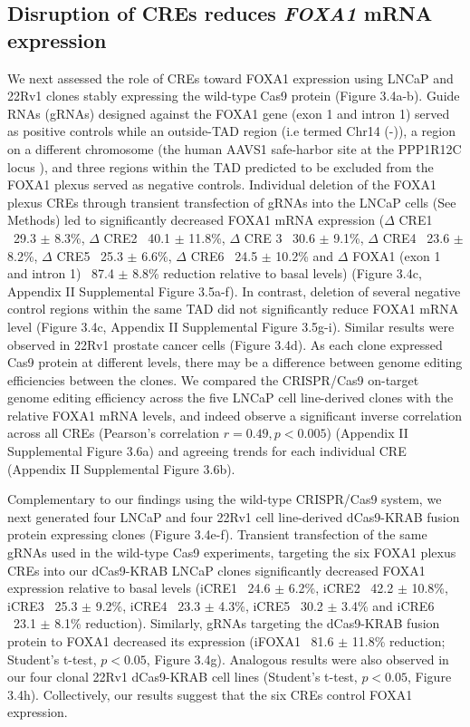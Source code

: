 \subsection{Disruption of CREs reduces \emph{FOXA1} mRNA expression}

We next assessed the role of CREs toward FOXA1 expression using LNCaP and 22Rv1 clones stably expressing the wild-type Cas9 protein (Figure 3.4a-b).
Guide RNAs (gRNAs) designed against the FOXA1 gene (exon 1 and intron 1) served as positive controls while an outside-TAD region (i.e termed Chr14 (-)), a region on a different chromosome (the human AAVS1 safe-harbor site at the PPP1R12C locus \cite{kronTMPRSS2ERGFusion2017,dekelverFunctionalGenomicsProteomics2010}), and three regions within the TAD predicted to be excluded from the FOXA1 plexus served as negative controls.
Individual deletion of the FOXA1 plexus CREs through transient transfection of gRNAs into the LNCaP cells (See Methods) led to significantly decreased FOXA1 mRNA expression ($\Delta$ CRE1 ~29.3 $\pm$ 8.3\%, $\Delta$ CRE2 ~40.1 $\pm$ 11.8\%, $\Delta$ CRE 3 ~30.6 $\pm$ 9.1\%, $\Delta$ CRE4 ~23.6 $\pm$ 8.2\%, $\Delta$ CRE5 ~25.3 $\pm$ 6.6\%, $\Delta$ CRE6 ~24.5 $\pm$ 10.2\% and $\Delta$ FOXA1 (exon 1 and intron 1) ~87.4 $\pm$ 8.8\% reduction relative to basal levels) (Figure 3.4c, Appendix II Supplemental Figure 3.5a-f).
In contrast, deletion of several negative control regions within the same TAD did not significantly reduce FOXA1 mRNA level (Figure 3.4c, Appendix II Supplemental Figure 3.5g-i).
Similar results were observed in 22Rv1 prostate cancer cells (Figure 3.4d).
As each clone expressed Cas9 protein at different levels, there may be a difference between genome editing efficiencies between the clones.
We compared the CRISPR/Cas9 on-target genome editing efficiency across the five LNCaP cell line-derived clones with the relative FOXA1 mRNA levels, and indeed observe a significant inverse correlation across all CREs (Pearson’s correlation $r = 0.49, p < 0.005$) (Appendix II Supplemental Figure 3.6a) and agreeing trends for each individual CRE (Appendix II Supplemental Figure 3.6b).

Complementary to our findings using the wild-type CRISPR/Cas9 system, we next generated four LNCaP and four 22Rv1 cell line-derived dCas9-KRAB fusion protein expressing clones (Figure 3.4e-f).
Transient transfection of the same gRNAs used in the wild-type Cas9 experiments, targeting the six FOXA1 plexus CREs into our dCas9-KRAB LNCaP clones significantly decreased FOXA1 expression relative to basal levels (iCRE1 ~24.6 $\pm$ 6.2\%, iCRE2 ~42.2 $\pm$ 10.8\%, iCRE3 ~25.3 $\pm$ 9.2\%, iCRE4 ~23.3 $\pm$ 4.3\%, iCRE5 ~30.2 $\pm$ 3.4\% and iCRE6 ~23.1 $\pm$ 8.1\% reduction).
Similarly, gRNAs targeting the dCas9-KRAB fusion protein to FOXA1 decreased its expression (iFOXA1 ~81.6 $\pm$ 11.8\% reduction; Student’s t-test, $p<0.05$, Figure 3.4g).
Analogous results were also observed in our four clonal 22Rv1 dCas9-KRAB cell lines (Student’s t-test, $p<0.05$, Figure 3.4h).
Collectively, our results suggest that the six CREs control FOXA1 expression.

